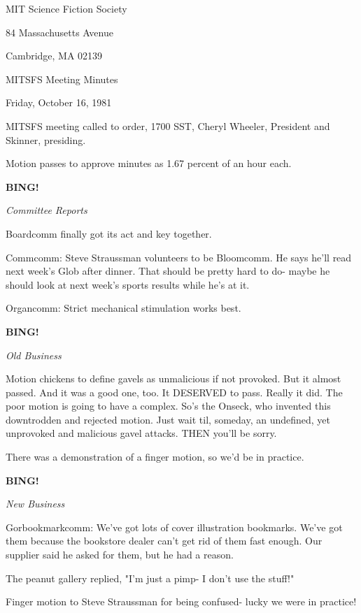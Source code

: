 \documentclass[12pt]{article}
\newcommand{\bing}{{\bf BING!} }
\newcommand{\goto}[1]{\bing \vskip 12pt \centerline{{\em{#1}}}}
\begin{document}
\begin{center}

MIT Science Fiction Society 

84 Massachusetts Avenue

Cambridge, MA 02139

\vspace{12pt}

MITSFS Meeting Minutes 

Friday, October 16, 1981

\end{center}
 
\vspace{18pt}

\setlength{\parskip}{6pt}

\noindent
MITSFS meeting called to order, 1700 SST,
Cheryl Wheeler, President and Skinner, presiding.

Motion passes to approve minutes as 1.67 percent of an hour each.

\goto{Committee Reports}

Boardcomm finally got its act and key together.

Commcomm: Steve Straussman volunteers to be Bloomcomm. He says he'll read next week's Glob after dinner. That should be pretty hard to do- maybe he should look at next week's sports results while he's at it.

Organcomm: Strict mechanical stimulation works best.

\goto{Old Business}

Motion chickens to define gavels as unmalicious if not provoked. But it almost passed. And it was a good one, too. It DESERVED to pass. Really it did. The poor motion is going to have a complex. So's the Onseck, who invented this downtrodden and rejected motion. Just wait til, someday, an undefined, yet unprovoked and malicious gavel attacks. THEN you'll be sorry.

There was a demonstration of a finger motion, so we'd be in practice.

\goto{New Business}

Gorbookmarkcomm: We've got lots of cover illustration bookmarks. We've got them because the bookstore dealer can't get rid of them fast enough. Our supplier said he asked for them, but he had a reason.

The peanut gallery replied, "I'm just a pimp- I don't use the stuff!"

Finger motion to Steve Straussman for being confused- lucky we were in practice!
\end{document}

